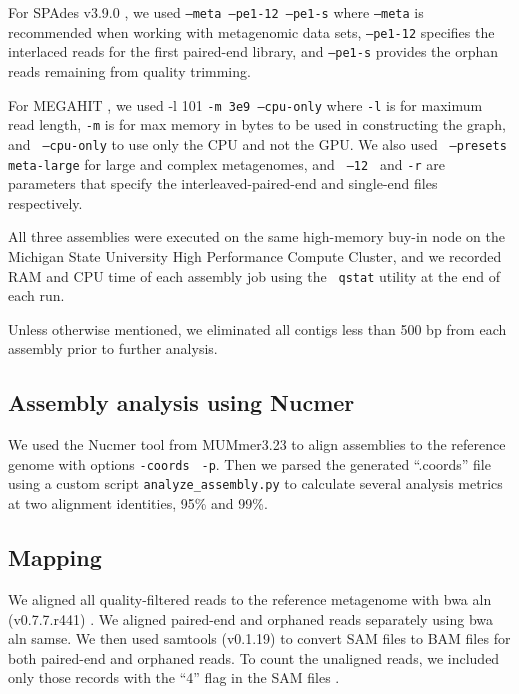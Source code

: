 \documentclass[10pt,a4paper,twocolumn]{article}
\begin{document}
For SPAdes v3.9.0 \cite{spades}, we used { \tt {--meta --pe1-12
    --pe1-s}} where {\tt{--meta}} is recommended when working with
metagenomic data sets, {\tt{--pe1-12}} specifies the interlaced reads
for the first paired-end library, and {\tt{--pe1-s}} provides the
orphan reads remaining from quality trimming.

For MEGAHIT \cite{megahit}, we used -l 101 {\tt{-m 3e9
    --cpu-only}} where {\tt -l} is for maximum read length, {\tt -m} is
for max memory in bytes to be used in constructing the graph, and {\tt
  {--cpu-only}} to use only the CPU and not the GPU. We also used {\tt
  {--presets meta-large}} for large and complex metagenomes, and {\tt
  {--12} } and {\tt{-r}} are parameters that specify the
interleaved-paired-end and single-end files respectively.

All three assemblies were executed on the same high-memory buy-in node
on the Michigan State University High Performance Compute Cluster, and
we recorded RAM and CPU time of each assembly job using the {\tt
  qstat} utility at the end of each run.

Unless otherwise mentioned, we eliminated all contigs less than 500 bp
from each assembly prior to further analysis.

\subsection*{Assembly analysis using Nucmer}

We used the Nucmer tool from MUMmer3.23 \cite{mummer3.0} to align
assemblies to the reference genome with options {\tt \--coords} {\tt
  -p}. Then we parsed the generated ``.coords'' file using a custom
script {\tt{analyze\_assembly.py}} to calculate several analysis
metrics at two alignment identities, 95\% and 99\%.

\subsection*{Mapping}

We aligned all quality-filtered reads to the reference metagenome with
bwa aln (v0.7.7.r441) \cite{bwa}. We aligned paired-end and orphaned
reads separately using bwa aln samse. We then used samtools (v0.1.19)
\cite{sam-stools} to convert SAM files to BAM files for both
paired-end and orphaned reads. To count the unaligned reads, we
included only those records with the ``4'' flag in the SAM files
\cite{sam-stools}.
 
\end{document}
